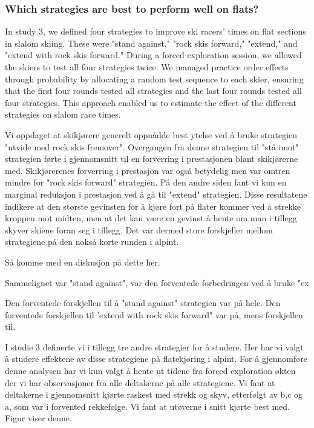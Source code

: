 \documentclass[letterpaper,10pt]{article}
\begin{document}
\subsubsection{Which strategies are best to perform well on flats?}
In study 3, we defined four strategies to improve ski racers' times on flat sections in slalom skiing. These were "stand against," "rock skis forward," "extend," and "extend with rock skis forward." During a forced exploration session, we allowed the skiers to test all four strategies twice. We managed practice order effects through probability by allocating a random test sequence to each skier, ensuring that the first four rounds tested all strategies and the last four rounds tested all four strategies. This approach enabled us to estimate the effect of the different strategies on slalom race times. 

Vi oppdaget at skikjørere generelt oppnådde best ytelse ved å bruke strategien "utvide med rock skis fremover". Overgangen fra denne strategien til "stå imot" strategien førte i gjennomsnitt til en forverring i prestasjonen blant skikjørerne med. Skikjørerenes forverring i prestasjon var også betydelig men var omtren mindre for "rock skis forward" strategien. På den andre siden fant vi kun en marginal reduksjon i prestasjon ved å gå til "extend" strategien. Disse resultatene indikere at den største gevinsten for å kjøre fort på flater kommer ved å strekke kroppen mot midten, men at det kan være en gevinst å hente om man i tillegg skyver skiene foran seg i tillegg. Det var dermed store forskjeller mellom strategiene på den nokså korte runden i alpint.

Så komme med en diskusjon på dette her. 

 


Sammelignet var "stand against", var den forventede forbedringen ved å bruke "ex


Den forventede forskjellen til å "stand against" strategien var på hele. Den forventede forskjellen til 'extend with rock skis forward" var på, mens forskjellen til. 








I studie 3 definerte vi i tillegg tre andre strategier for å studere. Her har vi valgt å studere effektene av disse strategiene på flatekjøring i alpint. For å gjennomføre denne analysen har vi kun valgt å hente ut tidene fra forced exploration økten der vi har observasjoner fra alle deltakerne på alle strategiene. Vi fant at deltakerne i gjennomsnitt kjørte raskest med strekk og skyv, etterfølgt av b,c og a, som var i forvented rekkefølge. Vi fant at utøverne i snitt kjørte best med. Figur viser denne. 
\end{document}

